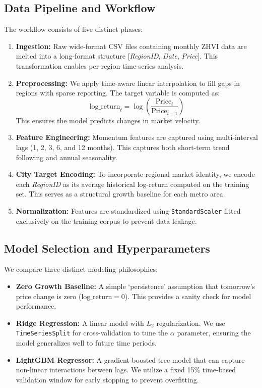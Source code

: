 \documentclass[11pt,a4paper]{article}
\begin{document}
\subsection{Data Pipeline and Workflow}
The workflow consists of five distinct phases:
\begin{enumerate}
    \item \textbf{Ingestion:} Raw wide-format CSV files containing monthly ZHVI data are melted into a long-format structure [\textit{RegionID}, \textit{Date}, \textit{Price}]. This transformation enables per-region time-series analysis.
    \item \textbf{Preprocessing:} We apply time-aware linear interpolation to fill gaps in regions with sparse reporting. The target variable is computed as:
    \begin{equation}
        \text{log\_return}_t = \log\left(\frac{\text{Price}_t}{\text{Price}_{t-1}}\right)
    \end{equation}
    This ensures the model predicts changes in market velocity.
    \item \textbf{Feature Engineering:} Momentum features are captured using multi-interval lags (1, 2, 3, 6, and 12 months). This captures both short-term trend following and annual seasonality.
    \item \textbf{City Target Encoding:} To incorporate regional market identity, we encode each \textit{RegionID} as its average historical log-return computed on the training set. This serves as a structural growth baseline for each metro area.
    \item \textbf{Normalization:} Features are standardized using \texttt{StandardScaler} fitted exclusively on the training corpus to prevent data leakage.
\end{enumerate}

\subsection{Model Selection and Hyperparameters}
We compare three distinct modeling philosophies:
\begin{itemize}
    \item \textbf{Zero Growth Baseline:} A simple `persistence' assumption that tomorrow's price change is zero ($\text{log\_return} = 0$). This provides a sanity check for model performance.
    \item \textbf{Ridge Regression:} A linear model with $L_2$ regularization. We use \texttt{TimeSeriesSplit} for cross-validation to tune the $\alpha$ parameter, ensuring the model generalizes well to future time periods.
    \item \textbf{LightGBM Regressor:} A gradient-boosted tree model that can capture non-linear interactions between lags. We utilize a fixed 15\% time-based validation window for early stopping to prevent overfitting.
\end{itemize}
\end{document}
